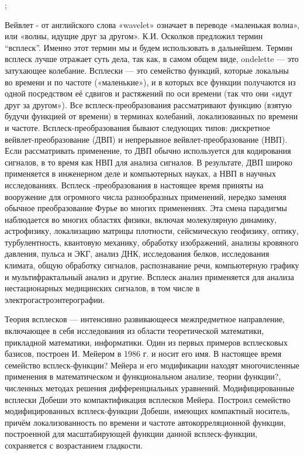 



; 


Вейвлет - от английского слова «wavelet» означает в переводе «маленькая волна», или «волны, идущие друг за другом». К.И. Осколков предложил термин “всплеск”. Именно этот термин мы и будем использовать в дальнейшем. Термин всплеск лучше отражает суть дела, так как, в самом общем виде, ondelette — это затухающее колебание.
Всплески — это семейство функций, которые локальны во времени и по частоте («маленькие»), и в которых все функции получаются из одной посредством её сдвигов и растяжений по оси времени (так что они «идут друг за другом»).
Все всплеск-преобразования рассматривают функцию (взятую будучи функцией от времени) в терминах колебаний, локализованных по времени и частоте. Всплеск-преобразования бывают следующих типов: дискретное вейвлет-преобразование (ДВП) и непрерывное вейвлет-преобразование (НВП).
Если рассматривать применение, то ДВП обычно используется для кодирования сигналов, в то время как НВП для анализа сигналов. В результате, ДВП широко применяется в инженерном деле и компьютерных науках, а НВП в научных исследованиях. Всплеск -преобразования в настоящее время приняты на вооружение для огромного числа разнообразных применений, нередко заменяя обычное преобразование Фурье во многих применениях. Эта смена парадигмы наблюдается во многих областях физики, включая молекулярную динамику, астрофизику, локализацию матрицы плотности, сейсмическую геофизику, оптику, турбулентность, квантовую механику, обработку изображений, анализы кровяного давления, пульса и ЭКГ, анализ ДНК, исследования белков, исследования климата, общую обработку сигналов, распознавание речи, компьютерную графику и мультифрактальный анализ и другие. Всплеск анализ применяется для анализа нестационарных медицинских сигналов, в том числе в электрогастроэнтерографии.

Теория всплесков — интенсивно развивающееся межпредметное направление, включающее в себя исследования из области теоретической математики, прикладной математики, информатики. Один из первых примеров всплесковых базисов, построен И. Мейером в 1986 г. и носит его имя. В настоящее время семейство всплеск-функции? Мейера и его модификации находят многочисленные применения в математическом и функциональном анализе, теории функции?, численных методах решения дифференциальных уравнений.
Модифицированные всплески Добеши это компактификация всплесков Мейера.
Построил семейство модифицированных всплеск-функции Добеши, имеющих компактный носитель, причём локализованность по времени и частоте автокорреляционной функции, построенной для масштабирующей функции данной всплеск-функции, сохраняется с возрастанием гладкости.
